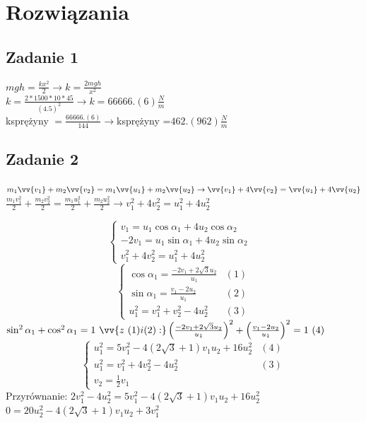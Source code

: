 \documentclass[14pt]{extarticle}
\begin{document}
    \section{Rozwiązania}
    \subsection{Zadanie 1}
    \Large
        \(mgh=\frac{kx^2}{2} \rightarrow k=\frac{2mgh}{x^2}\)\\
        \(k=\frac{2\ast 1500 \ast 10\ast 45}{(4.5)^2} \rightarrow k=66666.(6)\frac{N}{m}\)\\
        k\footnotesize sprężyny \Large\(=\frac{66666.(6)}{144} \rightarrow\)k\footnotesize sprężyny \LARGE=\underline{\(462.(962)\frac{N}{m}\)}
    \subsection{Zadanie 2}
    \large
    $m_1\vv{v_1}+m_2\vv{v_2}=m_1\vv{u_1}+m_2\vv{u_2} \rightarrow \vv{v_1} + 4\vv{v_2} = \vv{u_1} + 4\vv{u_2}$\\
    $\frac{m_1v_1^2}{2}+\frac{m_2v_2^2}{2}=\frac{m_1u_1^2}{2}+\frac{m_2u_2^2}{2} \rightarrow v_1^2 + 4v_2^2 = u_1^2 + 4u_2^2 $
    
    \begin{equation*}
        \begin{cases}
            v_1 = u_1\cos\alpha _1 + 4u_2\cos\alpha _2 &\\
            -2v_1  = u_1\sin\alpha _1 + 4u_2\sin\alpha _2 &\\
            v_1^2 + 4v_2^2 = u_1^2 + 4u_2^2  &
        \end{cases}
    \end{equation*}
    \begin{equation*}
        \begin{cases}
            \cos\alpha _1 = \frac{-2v_1+2{\sqrt{3}}u_2}{u_1}&(1)\\
            \sin\alpha _1 = \frac{v_1-2u_2}{u_1}&(2)\\
            u_1^2 = v_1^2 + v_2^2 - 4u_2^2&(3)
        \end{cases}
    \end{equation*}
    $\sin^2\alpha _1 + \cos^2\alpha _1 = 1\ \vv{z \ (1)i(2):}
    \left(\frac{-2v_1+2{\sqrt{3}}u_2}{u_1}\right)^2 + \left(\frac{v_1-2u_2}{u_1}\right)^2 = 1 \ (4)$
    \begin{equation*}
        \begin{cases}
            u_1^2 = 5v_1^2-4\left(2{\sqrt{3}}+1\right)v_1u_2+16u_2^2&(4)\\
            u_1^2 = v_1^2 + 4v_2^2 - 4u_2^2&(3)\\
            v_2 = \frac{1}{2}v_1&
        \end{cases}
    \end{equation*}
        Przyrównanie: $2v_1^2 - 4u_2^2=5v_1^2-4\left(2{\sqrt{3}}+1\right)v_1u_2+16u_2^2$\\
        $ 0 = 20u_2^2-4\left(2{\sqrt{3}}+1\right)v_1u_2+3v_1^2 $\\
\end{document}
